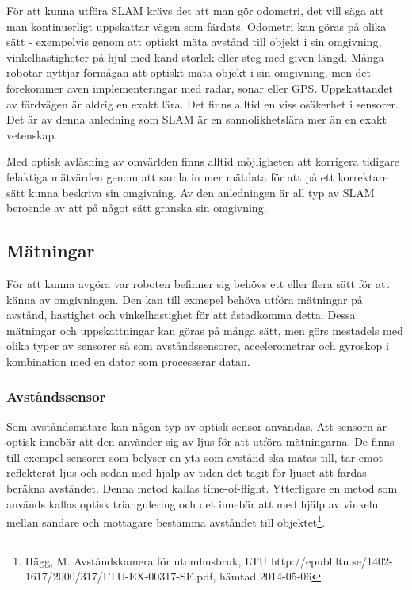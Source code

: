 \documentclass[a4paper,12pt,fleqn]{article}
\begin{document}
För att kunna utföra SLAM krävs det att man gör odometri, det vill säga att man kontinuerligt uppskattar vägen som färdats. Odometri kan göras på olika sätt - exempelvis genom att optiskt mäta avstånd till objekt i sin omgivning, vinkelhastigheter på hjul med känd storlek eller steg med given längd. Många robotar nyttjar förmågan att optiskt mäta objekt i sin omgivning, men det förekommer även implementeringar med radar, sonar eller GPS. Uppskattandet av färdvägen är aldrig en exakt lära. Det finns alltid en viss osäkerhet i sensorer. Det är av denna anledning som SLAM är en sannolikhetslära mer än en exakt vetenskap. 

Med optisk avläsning av omvärlden finns alltid möjligheten att korrigera tidigare felaktiga mätvärden genom att samla in mer mätdata för att på ett korrektare sätt kunna beskriva sin omgivning. Av den anledningen är all typ av SLAM beroende av att på något sätt granska sin omgivning. 

\subsection{Mätningar}

För att kunna avgöra var roboten befinner sig behövs ett eller flera sätt för att känna av omgivningen. Den kan till exmepel behöva utföra mätningar på avstånd, hastighet och vinkelhastighet för att åstadkomma detta. Dessa mätningar och uppskattningar kan göras på många sätt, men görs mestadels med olika typer av sensorer så som avståndssensorer, accelerometrar och gyroskop i kombination med en dator som processerar datan.

\subsubsection{Avståndssensor}

Som avståndsmätare kan någon typ av optisk sensor användas. Att sensorn är optisk innebär att den använder sig av ljus för att utföra mätningarna. De finns till exempel sensorer som belyser en yta som avstånd ska mätas till, tar emot reflekterat ljus och sedan med hjälp av tiden det tagit för ljuset att färdas beräkna avståndet. Denna metod kallas time-of-flight. Ytterligare en metod som används kallas optisk triangulering och det innebär att med hjälp av vinkeln mellan sändare och mottagare bestämma avståndet till objektet\footnote{Hägg, M. Avståndskamera för utomhusbruk, LTU http://epubl.ltu.se/1402-1617/2000/317/LTU-EX-00317-SE.pdf, hämtad 2014-05-06}.
\end{document}
